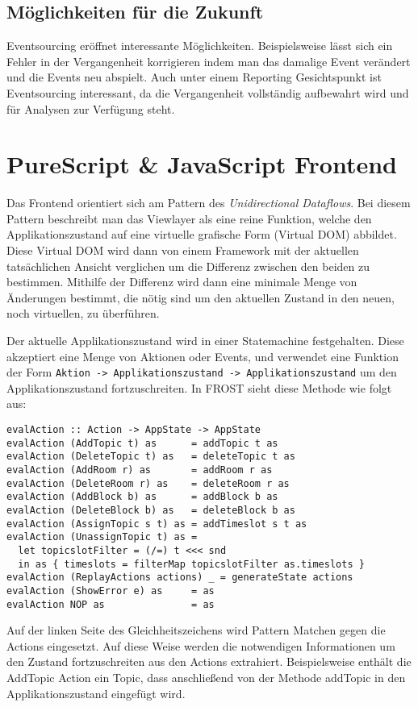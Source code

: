 \subsection*{Möglichkeiten für die Zukunft}
Eventsourcing eröffnet interessante Möglichkeiten. Beispielsweise lässt sich ein
Fehler in der Vergangenheit korrigieren indem man das damalige Event verändert
und die Events neu abspielt. Auch unter einem Reporting Gesichtspunkt ist
Eventsourcing interessant, da die Vergangenheit vollständig aufbewahrt wird und
für Analysen zur Verfügung steht.


\section{PureScript \& JavaScript Frontend}
\label{sec:frontend}
Das Frontend orientiert sich am Pattern des \textit{Unidirectional Dataflows}.
Bei diesem Pattern beschreibt man das Viewlayer als eine reine Funktion, welche
den Applikationszustand auf eine virtuelle grafische Form (Virtual DOM)
abbildet. Diese Virtual DOM wird dann von einem Framework mit der aktuellen
tatsächlichen Ansicht verglichen um die Differenz zwischen den beiden zu
bestimmen. Mithilfe der Differenz wird dann eine minimale Menge von Änderungen
bestimmt, die nötig sind um den aktuellen Zustand in den neuen, noch
virtuellen, zu überführen.

Der aktuelle Applikationszustand wird in einer Statemachine festgehalten. Diese
akzeptiert eine Menge von Aktionen oder Events, und verwendet eine Funktion der
Form \texttt{Aktion -> Applikationszustand -> Applikationszustand} um den
Applikationszustand fortzuschreiten. In FROST sieht diese Methode wie folgt aus:
\begin{lstlisting}
evalAction :: Action -> AppState -> AppState
evalAction (AddTopic t) as      = addTopic t as
evalAction (DeleteTopic t) as   = deleteTopic t as
evalAction (AddRoom r) as       = addRoom r as
evalAction (DeleteRoom r) as    = deleteRoom r as
evalAction (AddBlock b) as      = addBlock b as
evalAction (DeleteBlock b) as   = deleteBlock b as
evalAction (AssignTopic s t) as = addTimeslot s t as
evalAction (UnassignTopic t) as =
  let topicslotFilter = (/=) t <<< snd
  in as { timeslots = filterMap topicslotFilter as.timeslots }
evalAction (ReplayActions actions) _ = generateState actions
evalAction (ShowError e) as     = as
evalAction NOP as               = as
\end{lstlisting}

Auf der linken Seite des Gleichheitszeichens wird Pattern Matchen gegen die
Actions eingesetzt. Auf diese Weise werden die notwendigen Informationen um den
Zustand fortzuschreiten aus den Actions extrahiert. Beispielsweise enthält die
AddTopic Action ein Topic, dass anschließend von der Methode addTopic in den
Applikationszustand eingefügt wird.

